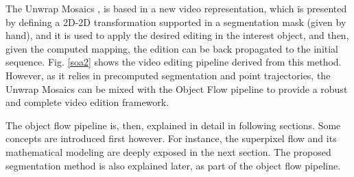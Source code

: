 The Unwrap Mosaics \cite{c41}, is based in a new 
video representation, which is presented by defining a 2D-2D transformation supported in a segmentation mask (given by hand), and it is used to apply the desired editing in the 
interest object, and then, given the computed mapping, the edition can be back propagated to the initial sequence. Fig. \ref{soa2} shows the video editing pipeline derived from 
this method. However, as it relies in precomputed segmentation and point trajectories, the Unwrap Mosaics can be mixed with the Object Flow pipeline to provide a robust and 
complete video edition framework. 

The object flow pipeline is, then, explained in detail in following sections. Some concepts 
are introduced first however. For instance, the superpixel flow and its mathematical 
modeling are deeply exposed in the next section. The proposed segmentation method 
is also explained later, as part of the object flow pipeline.
